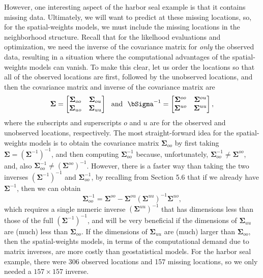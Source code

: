 \documentclass[12pt, titlepage]{article}
\begin{document}
However, one interesting aspect of the harbor seal example is that it contains missing data.  Ultimately, we will want to predict at these missing locations, so, for the spatial-weights models, we must include the missing locations in the neighborhood structure.  Recall that for the likelhood evaluations and optimization, we need the inverse of the covariance matrix for \textit{only} the observed data, resulting in a situation where the computational advantages of the spatial-weights models can vanish. To make this clear, let us order the locations so that all of the observed locations are first, followed by the unobserved locations, and then the covariance matrix and inverse of the covariance matrix are
\begin{equation} \label{eq:blockMats}
    \boldsymbol{\Sigma} = 
    \begin{bmatrix}
       \boldsymbol{\Sigma}_{oo} & \boldsymbol{\Sigma}_{ou} \\
       \boldsymbol{\Sigma}_{uo} & \boldsymbol{\Sigma}_{uu}
    \end{bmatrix}  \ \textrm{ and } \  
    \bSigma^{-1} = 
    \begin{bmatrix}
       \boldsymbol{\Sigma}^{oo} & \boldsymbol{\Sigma}^{ou} \\
       \boldsymbol{\Sigma}^{uo} & \boldsymbol{\Sigma}^{uu}
    \end{bmatrix}, 
\end{equation}
where the subscripts and superscripts $o$ and $u$ are for the observed and unobserved locations, respectively. The most straight-forward idea for the spatial-weights models is to obtain the covariance matrix $\boldsymbol{\Sigma}_{oo}$ by first taking $\boldsymbol{\Sigma} = (\boldsymbol{\Sigma}^{-1})^{-1}$, and then computing $\boldsymbol{\Sigma}_{oo}^{-1}$ because, unfortunately, $\boldsymbol{\Sigma}_{oo}^{-1} \neq \boldsymbol{\Sigma}^{oo}$, and, also $\boldsymbol{\Sigma}_{oo}^{-1} \neq (\boldsymbol{\Sigma}^{oo})^{-1}$. However, there is a faster way than taking the two inverses $(\boldsymbol{\Sigma}^{-1})^{-1}$ and $\boldsymbol{\Sigma}_{oo}^{-1}$, by recalling from Section 5.6 that if we already have $\boldsymbol{\Sigma}^{-1}$, then we can obtain 
$$
    \boldsymbol{\Sigma}_{oo}^{-1} = \boldsymbol{\Sigma}^{oo} - \boldsymbol{\Sigma}^{ou} (\boldsymbol{\Sigma}^{uu})^{-1} \boldsymbol{\Sigma}^{uo},
$$
which requires a single numeric inverse $(\boldsymbol{\Sigma}^{uu})^{-1}$ that has dimensions less than those of the full $(\boldsymbol{\Sigma}^{-1})^{-1}$, and will be very beneficial if the dimensions of $\boldsymbol{\Sigma}_{uu}$ are (much) less than $\boldsymbol{\Sigma}_{oo}$.  If the dimensions of $\boldsymbol{\Sigma}_{uu}$ are (much) larger than $\boldsymbol{\Sigma}_{oo}$, then the spatial-weights models, in terms of the computational demand due to matrix inverses, are more costly than geostatistical models.  For the harbor seal example, there were 306 observed locations and 157 missing locations, so we only needed a $157 \times 157$ inverse. 
\end{document}
